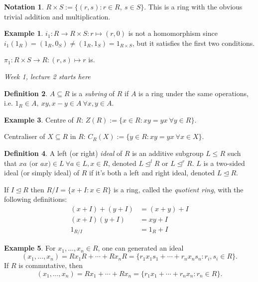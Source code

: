\documentclass[a4paper]{article}
\theoremstyle{definition}
\newtheorem{defn}{Definition}[subsection]
\newtheorem{example}[defn]{Example}
\newtheorem*{notation}{Notation}
\begin{document}
\begin{notation}
$R\times S:=\{(r,s):r\in R,\ s\in S\}$. This is a ring with the obvious trivial addition and multiplication.
\end{notation}

\begin{example}
$i_1:R\rightarrow R\times S:r\mapsto (r,0)$ is not a homomorphism since $i_1(1_R)=(1_R,0_S)\neq (1_R,1_S)=1_{R\times S}$, but it satisfies the first two conditions.

$\pi_1:R\times S\rightarrow R:(r,s)\mapsto r$ is.
\end{example}

\begin{flushright}
\textit{Week 1, lecture 2 starts here}
\end{flushright}

\begin{defn}
$A\subseteq R$ is a \textit{subring} of $R$ if $A$ is a ring under the same operations, i.e. $1_R\in A,\ xy,x-y\in A \ \forall x,y\in A$.
\end{defn}
\begin{example}
Centre of $R$: $Z(R):=\{x\in R:xy=yx \ \forall y\in R\}$.

Centraliser of $X\subseteq R$ in $R$: $C_R(X):=\{y\in R:xy=yx \ \forall x\in X\}$.
\end{example}

\begin{defn}
A left (or right) \textit{ideal} of $R$ is an additive subgroup $L\leq R$ such that $xa \text{ (or }ax\text{)}\in L \ \forall a\in L,x\in R$, denoted $L\unlhd^l R$ or $L\unlhd^r R$. $L$ is a two-sided ideal (or simply ideal) of $R$ if it's both a left and right ideal, denoted $L\unlhd R$.

If $I\unlhd R$ then $R/I=\{x+I:x\in R\}$ is a ring, called the \textit{quotient ring}, with the following definitions:
\[
\begin{aligned}
(x+I)+(y+I)&=(x+y)+I \\
(x+I)(y+I)&=xy+I \\
1_{R/I}&=1_R+I
\end{aligned}
\]
\end{defn}

\begin{example}
For $x_1,\ldots,x_n\in R$, one can generated an ideal
\[
(x_1,\ldots,x_n)=Rx_1R+\cdots+Rx_nR=\{r_1x_1s_1+\cdots+r_nx_ns_n:r_i,s_i\in R\}.
\]
If $R$ is commutative, then
\[
(x_1,\ldots,x_n)=Rx_1+\cdots+Rx_n=\{r_1x_1+\cdots+r_nx_n:r_n\in R\}.
\]
\end{example}
\end{document}
